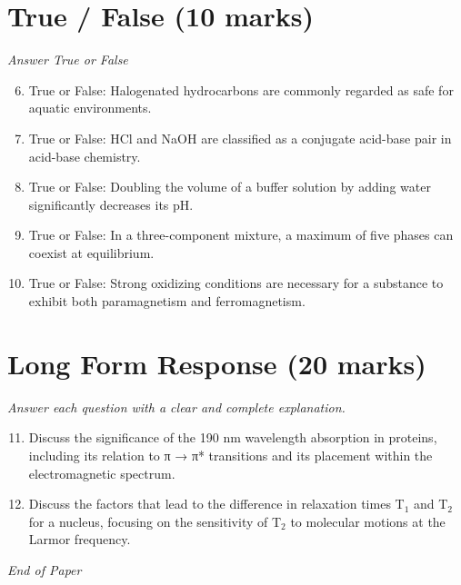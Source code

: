 \documentclass[12pt]{article}
\begin{document}
\section*{True / False (10 marks)}
\textit{Answer True or False}
\begin{enumerate}[label=\arabic*.]
\setcounter{enumi}{5}
\item True or False: Halogenated hydrocarbons are commonly regarded as safe for aquatic environments.
\item True or False: HCl and NaOH are classified as a conjugate acid-base pair in acid-base chemistry.
\item True or False: Doubling the volume of a buffer solution by adding water significantly decreases its pH.
\item True or False: In a three-component mixture, a maximum of five phases can coexist at equilibrium.
\item True or False: Strong oxidizing conditions are necessary for a substance to exhibit both paramagnetism and ferromagnetism.
\end{enumerate}

\section*{Long Form Response (20 marks)}
\textit{Answer each question with a clear and complete explanation.}
\begin{enumerate}[label=\arabic*.]
\setcounter{enumi}{10}
\item Discuss the significance of the 190 nm wavelength absorption in proteins, including its relation to π → π* transitions and its placement within the electromagnetic spectrum.
\item Discuss the factors that lead to the difference in relaxation times T$_{1}$ and T$_{2}$ for a nucleus, focusing on the sensitivity of T$_{2}$ to molecular motions at the Larmor frequency.
\end{enumerate}

\vfill
\noindent\textit{End of Paper}
\end{document}
